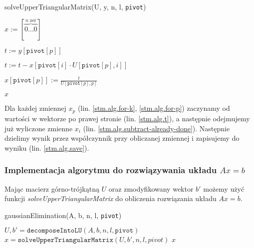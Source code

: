 \documentclass[10pt]{article}
\begin{document}
\begin{algorithm}[H]
    \caption{solveUpperTriangularMatrix(U, y, n, l, \texttt{pivot})}
    \begin{algorithmic}[1]
        \State $x := [\overbrace{0 \dots 0}^{n \text{ zer}}]$
        \label{stm.alg.for-k}
            \label{stm.alg.for-p}

                \State $t := y\left[\texttt{pivot}[p]\right]$\label{stm.alg.t}

                \label{stm.alg.for-rows-beneath}
                    \State $t := t - x\left[\texttt{pivot}[i] \cdot U[\texttt{pivot}[p], i]\right]$\label{stm.alg.subtract-already-done}
                \EndFor

                \State $x\left[\texttt{pivot}[p]\right] := \frac{t}{U\left[\texttt{pivot}[p], p\right]}$\label{stm.alg.save}

            \EndFor
        \EndFor
        \State \Return $x$
    \end{algorithmic}
\end{algorithm}

\noindent Dla każdej zmiennej $x_p$ (lin. \ref*{stm.alg.for-k}, \ref*{stm.alg.for-p}) zaczynamy od wartości w wektorze po prawej stronie (lin. \ref*{stm.alg.t}), a następnie odejmujemy już wyliczone zmienne $x_i$ (lin. \ref*{stm.alg.subtract-already-done}). Następnie dzielimy wynik przez współczynnik przy obliczanej zmiennej i zapisujemy do wyniku (lin. \ref*{stm.alg.save}).

\subsubsection{Implementacja algorytmu do rozwiązywania układu $Ax = b$}

Mając macierz górno-trójkątną $U$ oraz zmodyfikowany wektor $b'$ możemy użyć funkcji \textit{solveUpperTriangularMatrix} do obliczenia rozwiązania układu $Ax = b$.

\begin{algorithm}[H]
    \caption{gaussianElimination(A, b, n, l, \texttt{pivot})}
    \begin{algorithmic}[1]
        \State $U, b' = \texttt{decomposeIntoLU}(A, b, n, l, \texttt{pivot})$
        \State $x = \texttt{solveUpperTriangularMatrix}(U, b', n, l, pivot)$
        \State \Return $x$
    \end{algorithmic}
\end{algorithm}
\end{document}
